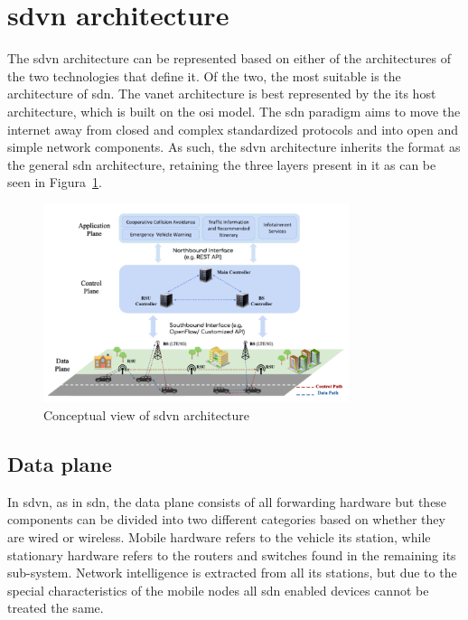 \section[SDVN architecture]{\gls{sdvn} architecture}

The \gls{sdvn} architecture can be represented based on either of the architectures of the two technologies that define it. Of the two, the most suitable is the architecture of \gls{sdn}. The \gls{vanet} architecture is best represented by the \gls{its} host architecture, which is built on the \gls{osi} model. The \gls{sdn} paradigm aims to move the internet away from closed and complex standardized protocols and into open and simple network components. As such, the \gls{sdvn} architecture inherits the format as the general \gls{sdn} architecture, retaining the three layers present in it as can be seen in Figura~\ref{fig:sdvn_arciotecture}. 

\begin{figure}
	\centering
	\includegraphics[width=0.8\textwidth]{Chapters/Figures/SDVNs/architecture.png}
	\caption{Conceptual view of \gls{sdvn} architecture~\cite{toufga_towards_2020}}
	\label{fig:sdvn_arciotecture}
\end{figure}

\subsection{Data plane}

In \gls{sdvn}, as in \gls{sdn}, the data plane consists of all forwarding hardware but these components can be divided into two different categories based on whether they are wired or wireless. Mobile hardware refers to the vehicle \gls{its} station, while stationary hardware refers to the routers and switches found in the remaining \gls{its} sub-system. Network intelligence is extracted from all \gls{its} stations, but due to the special characteristics of the mobile nodes all \gls{sdn} enabled devices cannot be treated the same. 

